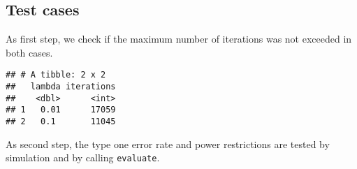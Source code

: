 \documentclass[]{book}
\newenvironment{Shaded}{\begin{snugshade}}{\end{snugshade}}
\newcommand{\DataTypeTok}[1]{\textcolor[rgb]{0.13,0.29,0.53}{#1}}
\newcommand{\KeywordTok}[1]{\textcolor[rgb]{0.13,0.29,0.53}{\textbf{#1}}}
\newcommand{\NormalTok}[1]{#1}
\newcommand{\OperatorTok}[1]{\textcolor[rgb]{0.81,0.36,0.00}{\textbf{#1}}}
\newcommand{\StringTok}[1]{\textcolor[rgb]{0.31,0.60,0.02}{#1}}
\begin{document}
\hypertarget{test-cases-13}{%
\subsection{Test cases}\label{test-cases-13}}

As first step, we check if the maximum number of iterations was not exceeded
in both cases.

\begin{Shaded}
\end{Shaded}

\begin{verbatim}
## # A tibble: 2 x 2
##   lambda iterations
##    <dbl>      <int>
## 1   0.01      17059
## 2   0.1       11045
\end{verbatim}

As second step, the type one error rate and power restrictions are tested
by simulation and by calling \texttt{evaluate}.
\end{document}

